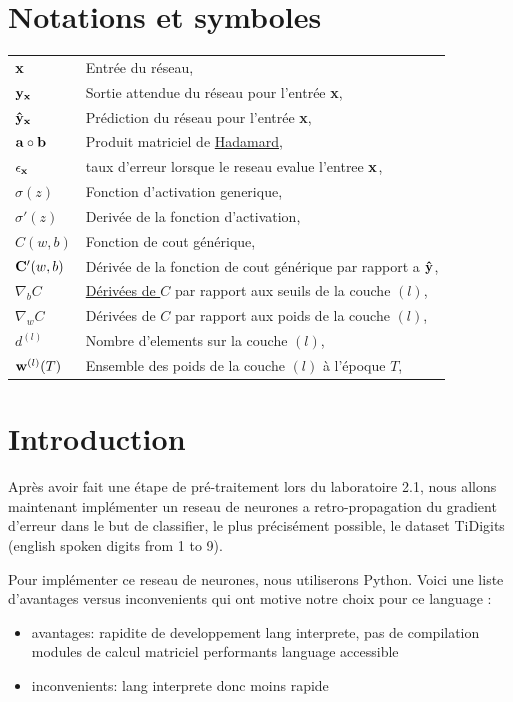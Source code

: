 \documentclass[11pt]{article}
\begin{document}
\EtsPageGenerate
\tableofcontents

\section{Notations et symboles}
\begin{tabular}{p{1.75cm}p{10cm}}
	${\bf x}$ & Entr\'ee du r\'eseau, \\
	${\bf y_x}$ & Sortie attendue du r\'eseau pour l'entr\'ee {\bf x}, \\
	${\bf \hat y_x}$ & Pr\'ediction du r\'eseau pour l'entr\'ee {\bf x}, \\
	${\bf a} \circ {\bf b}$ & Produit matriciel de
		\href{https://en.wikipedia.org/wiki/Hadamard_product_(matrices)}
		{Hadamard}, \\
	$\epsilon_{\bf x}$ & taux d'erreur lorsque le reseau evalue l'entree ${\bf x}$, \\
	$\sigma(z)$ & Fonction d'activation generique, \\
	$\sigma'(z)$ & Deriv\'ee de la fonction d'activation, \\
	$C(w, b)$ & Fonction de cout g\'en\'erique, \\
	${\bf C}'(w, b)$ & D\'eriv\'ee de la fonction de cout g\'en\'erique par
		rapport a ${\bf \hat y}$, \\
	$\nabla_bC$ & \href{https://en.wikipedia.org/wiki/Matrix_calculus}
		{D\'eriv\'ees de $C$} par rapport aux seuils de la couche $(l)$, \\
	$\nabla_wC$ & D\'eriv\'ees de $C$ par rapport aux poids de la couche $(l)$, \\
	$d^{(l)}$ & Nombre d'elements sur la couche $(l)$, \\
	${\bf w}^{(l)}(T)$ & Ensemble des poids de la couche $(l)$ \`a l'\'epoque $T$, \\
\end{tabular}
\newpage



\section{Introduction}
Après avoir fait une étape de pré-traitement lors du laboratoire 2.1, nous
allons maintenant implémenter un reseau de neurones a retro-propagation du
gradient d’erreur dans le but de classifier, le plus précisément possible,
le dataset TiDigits (english spoken digits from 1 to 9).

Pour implémenter ce reseau de neurones, nous utiliserons Python.
Voici une liste d'avantages versus inconvenients qui ont motive notre choix
pour ce language :
\begin{itemize}
	\item avantages:
		\subitem rapidite de developpement
		\subitem lang interprete, pas de compilation
		\subitem modules de calcul matriciel performants
		\subitem language accessible
	\item inconvenients:
		\subitem lang interprete donc moins rapide \\
\end{itemize}
\end{document}
